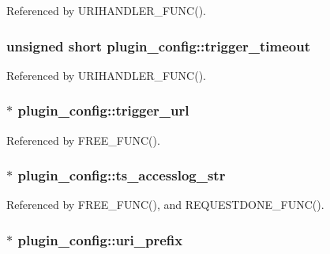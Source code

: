 Referenced by U\-R\-I\-H\-A\-N\-D\-L\-E\-R\-\_\-\-F\-U\-N\-C().

\hypertarget{structplugin__config_ac3d0a604deae5fe7540830d91f6196f6}{
\subsubsection[{trigger\-\_\-timeout}]{\setlength{\rightskip}{0pt plus 5cm}unsigned short plugin\-\_\-config\-::trigger\-\_\-timeout}}\label{structplugin__config_ac3d0a604deae5fe7540830d91f6196f6}


Referenced by U\-R\-I\-H\-A\-N\-D\-L\-E\-R\-\_\-\-F\-U\-N\-C().

\hypertarget{structplugin__config_ad6e253381a98c1de44924079f56aef61}{
\subsubsection[{trigger\-\_\-url}]{$\ast$ plugin\-\_\-config\-::trigger\-\_\-url}}\label{structplugin__config_ad6e253381a98c1de44924079f56aef61}


Referenced by F\-R\-E\-E\-\_\-\-F\-U\-N\-C().

\hypertarget{structplugin__config_a4fbaad72d7ba8e7f74f52ab59f20a9e3}{
\subsubsection[{ts\-\_\-accesslog\-\_\-str}]{$\ast$ plugin\-\_\-config\-::ts\-\_\-accesslog\-\_\-str}}\label{structplugin__config_a4fbaad72d7ba8e7f74f52ab59f20a9e3}


Referenced by F\-R\-E\-E\-\_\-\-F\-U\-N\-C(), and R\-E\-Q\-U\-E\-S\-T\-D\-O\-N\-E\-\_\-\-F\-U\-N\-C().

\hypertarget{structplugin__config_aef05c144457960745a6747518cc5f0d1}{
\subsubsection[{uri\-\_\-prefix}]{$\ast$ plugin\-\_\-config\-::uri\-\_\-prefix}}\label{structplugin__config_aef05c144457960745a6747518cc5f0d1}


